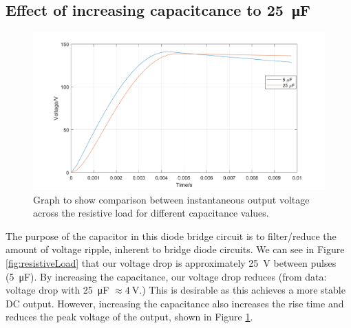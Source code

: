 \subsection{Effect of increasing capacitcance to \SI{25}{\micro\farad}}
\begin{figure}[H]
    \centering
    \includegraphics[width = \textwidth]{img/figure4.png}
    \caption{Graph to show comparison between instantaneous output voltage across the resistive load for different capacitance values.}
    \label{fig:comp1}
\end{figure}
The purpose of the capacitor in this diode bridge circuit is to filter/reduce the amount of voltage ripple, inherent to bridge diode circuits. We can see in Figure \ref{fig:resistiveLoad} that our voltage drop is approximately \SI{25}{\volt} between pulses (\SI{5}{\micro \farad}). By increasing the capacitance, our voltage drop reduces (from data: voltage drop with \SI{25}{\micro\farad} $\approx \SI{4}{\volt}$.) This is desirable as this achieves a more stable DC output. However, increasing the capacitance also increases the rise time and reduces the peak voltage of the output, shown in Figure \ref{fig:comp1}.
